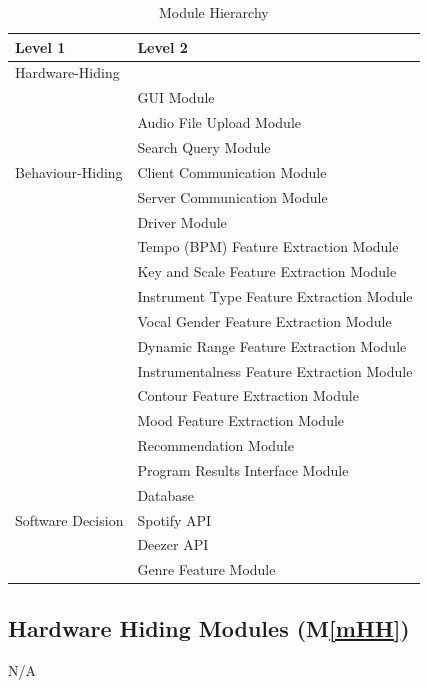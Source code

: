 \documentclass[12pt, titlepage]{article}
\newcommand{\mref}[1]{M\ref{#1}}
\begin{document}
\begin{table}[h!]
  \centering
  \begin{tabular}{p{} p{}}
  \toprule
  \textbf{Level 1} & \textbf{Level 2}\\
  \midrule
  
  {Hardware-Hiding} & ~ \\
  \midrule
  
  \multirow{7}{0.3\textwidth}{Behaviour-Hiding} & GUI Module\\
  & Audio File Upload Module\\
  & Search Query Module\\
  & Client Communication Module\\
  & Server Communication Module\\
  & Driver Module\\
  & Tempo (BPM) Feature Extraction Module\\
  & Key and Scale Feature Extraction Module\\
  & Instrument Type Feature Extraction Module\\
  & Vocal Gender Feature Extraction Module\\
  & Dynamic Range Feature Extraction Module\\
  & Instrumentalness Feature Extraction Module\\
  & Contour Feature Extraction Module\\
  & Mood Feature Extraction Module\\
  & Recommendation Module\\
  & Program Results Interface Module\\
  \midrule
  
  \multirow{3}{0.3\textwidth}{Software Decision} & Database\\
  & Spotify API\\
  & Deezer API\\
  & Genre Feature Module\\
  \bottomrule
  
  \end{tabular}
  \caption{Module Hierarchy}
  \label{TblMH}
  \end{table}

\subsection{Hardware Hiding Modules (\mref{mHH})}

\begin{description}
\item[N/A]
\end{description}
\end{document}
